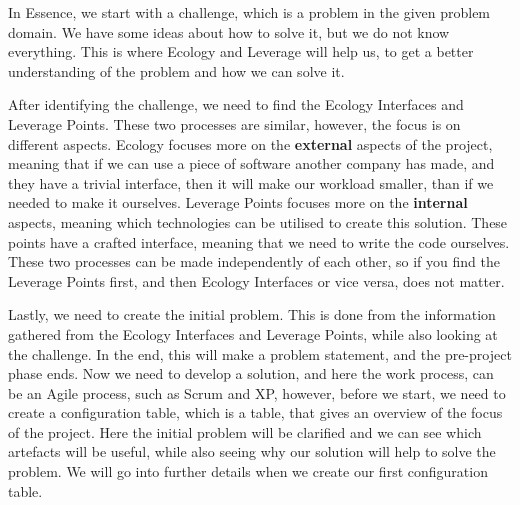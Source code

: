 In Essence, we start with a challenge, which is a problem in the given problem domain.
We have some ideas about how to solve it, but we do not know everything.
This is where Ecology and Leverage will help us, to get a better understanding of the problem and how we can solve it.

After identifying the challenge, we need to find the Ecology Interfaces and Leverage Points.
These two processes are similar, however, the focus is on different aspects.
Ecology focuses more on the \textbf{external} aspects of the project, meaning that if we can use a piece of software another company has made, and they have a trivial interface, then it will make our workload smaller, than if we needed to make it ourselves.
Leverage Points focuses more on the \textbf{internal} aspects, meaning which technologies can be utilised to create this solution.
These points have a crafted interface, meaning that we need to write the code ourselves.
These two processes can be made independently of each other, so if you find the Leverage Points first, and then Ecology Interfaces or vice versa, does not matter.

Lastly, we need to create the initial problem. 
This is done from the information gathered from the Ecology Interfaces and Leverage Points, while also looking at the challenge.
In the end, this will make a problem statement, and the pre-project phase ends.
Now we need to develop a solution, and here the work process, can be an Agile process, such as Scrum and XP, however, before we start, we need to create a configuration table, which is a table, that gives an overview of the focus of the project.
Here the initial problem will be clarified and we can see which artefacts will be useful, while also seeing why our solution will help to solve the problem.
We will go into further details when we create our first configuration table.
